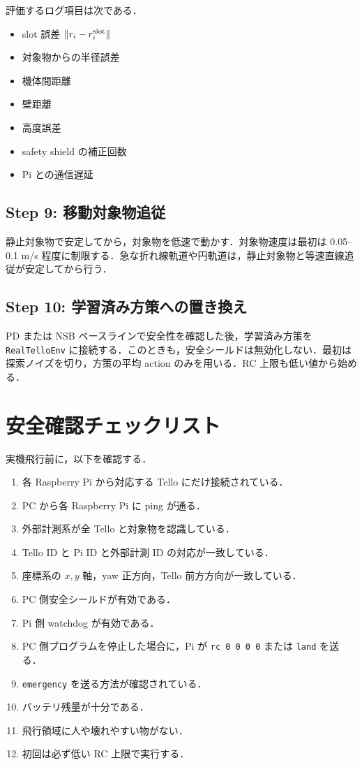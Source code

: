 評価するログ項目は次である．

\begin{itemize}
  \item slot 誤差 $\|r_i-r_i^{\rm slot}\|$
  \item 対象物からの半径誤差
  \item 機体間距離
  \item 壁距離
  \item 高度誤差
  \item safety shield の補正回数
  \item Pi との通信遅延
\end{itemize}

\subsection{Step 9: 移動対象物追従}

静止対象物で安定してから，対象物を低速で動かす．対象物速度は最初は 0.05--0.1 m/s 程度に制限する．急な折れ線軌道や円軌道は，静止対象物と等速直線追従が安定してから行う．

\subsection{Step 10: 学習済み方策への置き換え}

PD または NSB ベースラインで安全性を確認した後，学習済み方策を \texttt{RealTelloEnv} に接続する．このときも，安全シールドは無効化しない．最初は探索ノイズを切り，方策の平均 action のみを用いる．RC 上限も低い値から始める．

\section{安全確認チェックリスト}
\label{sec:safety_checklist}

実機飛行前に，以下を確認する．

\begin{enumerate}[label=\arabic*.]
  \item 各 Raspberry Pi から対応する Tello にだけ接続されている．
  \item PC から各 Raspberry Pi に ping が通る．
  \item 外部計測系が全 Tello と対象物を認識している．
  \item Tello ID と Pi ID と外部計測 ID の対応が一致している．
  \item 座標系の $x,y$ 軸，yaw 正方向，Tello 前方方向が一致している．
  \item PC 側安全シールドが有効である．
  \item Pi 側 watchdog が有効である．
  \item PC 側プログラムを停止した場合に，Pi が \texttt{rc 0 0 0 0} または \texttt{land} を送る．
  \item \texttt{emergency} を送る方法が確認されている．
  \item バッテリ残量が十分である．
  \item 飛行領域に人や壊れやすい物がない．
  \item 初回は必ず低い RC 上限で実行する．
\end{enumerate}

